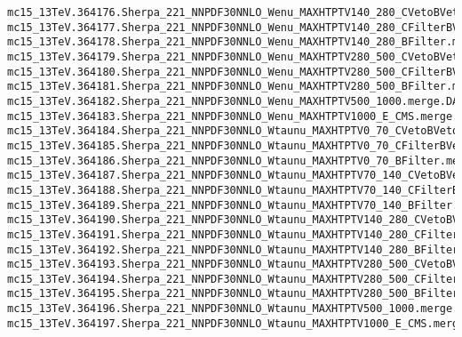 \begin{scriptsize}
\begin{verbatim}
mc15_13TeV.364176.Sherpa_221_NNPDF30NNLO_Wenu_MAXHTPTV140_280_CVetoBVeto.merge.DAOD_HIGG5D2.e5340_s2726_r7772_r7676_p2949
mc15_13TeV.364177.Sherpa_221_NNPDF30NNLO_Wenu_MAXHTPTV140_280_CFilterBVeto.merge.DAOD_HIGG5D2.e5340_s2726_r7772_r7676_p2949
mc15_13TeV.364178.Sherpa_221_NNPDF30NNLO_Wenu_MAXHTPTV140_280_BFilter.merge.DAOD_HIGG5D2.e5340_s2726_r7772_r7676_p2949
mc15_13TeV.364179.Sherpa_221_NNPDF30NNLO_Wenu_MAXHTPTV280_500_CVetoBVeto.merge.DAOD_HIGG5D2.e5340_s2726_r7772_r7676_p2949
mc15_13TeV.364180.Sherpa_221_NNPDF30NNLO_Wenu_MAXHTPTV280_500_CFilterBVeto.merge.DAOD_HIGG5D2.e5340_s2726_r7772_r7676_p2949
mc15_13TeV.364181.Sherpa_221_NNPDF30NNLO_Wenu_MAXHTPTV280_500_BFilter.merge.DAOD_HIGG5D2.e5340_s2726_r7772_r7676_p2949
mc15_13TeV.364182.Sherpa_221_NNPDF30NNLO_Wenu_MAXHTPTV500_1000.merge.DAOD_HIGG5D2.e5340_s2726_r7772_r7676_p2949
mc15_13TeV.364183.Sherpa_221_NNPDF30NNLO_Wenu_MAXHTPTV1000_E_CMS.merge.DAOD_HIGG5D2.e5340_s2726_r7772_r7676_p2949
mc15_13TeV.364184.Sherpa_221_NNPDF30NNLO_Wtaunu_MAXHTPTV0_70_CVetoBVeto.merge.DAOD_HIGG5D2.e5340_s2726_r7772_r7676_p2949
mc15_13TeV.364185.Sherpa_221_NNPDF30NNLO_Wtaunu_MAXHTPTV0_70_CFilterBVeto.merge.DAOD_HIGG5D2.e5340_s2726_r7772_r7676_p2949
mc15_13TeV.364186.Sherpa_221_NNPDF30NNLO_Wtaunu_MAXHTPTV0_70_BFilter.merge.DAOD_HIGG5D2.e5340_s2726_r7772_r7676_p2949
mc15_13TeV.364187.Sherpa_221_NNPDF30NNLO_Wtaunu_MAXHTPTV70_140_CVetoBVeto.merge.DAOD_HIGG5D2.e5340_s2726_r7772_r7676_p2949
mc15_13TeV.364188.Sherpa_221_NNPDF30NNLO_Wtaunu_MAXHTPTV70_140_CFilterBVeto.merge.DAOD_HIGG5D2.e5340_s2726_r7772_r7676_p2949
mc15_13TeV.364189.Sherpa_221_NNPDF30NNLO_Wtaunu_MAXHTPTV70_140_BFilter.merge.DAOD_HIGG5D2.e5340_s2726_r7772_r7676_p2949
mc15_13TeV.364190.Sherpa_221_NNPDF30NNLO_Wtaunu_MAXHTPTV140_280_CVetoBVeto.merge.DAOD_HIGG5D2.e5340_s2726_r7772_r7676_p2949
mc15_13TeV.364191.Sherpa_221_NNPDF30NNLO_Wtaunu_MAXHTPTV140_280_CFilterBVeto.merge.DAOD_HIGG5D2.e5340_s2726_r7772_r7676_p2949
mc15_13TeV.364192.Sherpa_221_NNPDF30NNLO_Wtaunu_MAXHTPTV140_280_BFilter.merge.DAOD_HIGG5D2.e5340_s2726_r7772_r7676_p2949
mc15_13TeV.364193.Sherpa_221_NNPDF30NNLO_Wtaunu_MAXHTPTV280_500_CVetoBVeto.merge.DAOD_HIGG5D2.e5340_s2726_r7772_r7676_p2949
mc15_13TeV.364194.Sherpa_221_NNPDF30NNLO_Wtaunu_MAXHTPTV280_500_CFilterBVeto.merge.DAOD_HIGG5D2.e5340_s2726_r7772_r7676_p2949
mc15_13TeV.364195.Sherpa_221_NNPDF30NNLO_Wtaunu_MAXHTPTV280_500_BFilter.merge.DAOD_HIGG5D2.e5340_s2726_r7772_r7676_p2949
mc15_13TeV.364196.Sherpa_221_NNPDF30NNLO_Wtaunu_MAXHTPTV500_1000.merge.DAOD_HIGG5D2.e5340_s2726_r7772_r7676_p2949
mc15_13TeV.364197.Sherpa_221_NNPDF30NNLO_Wtaunu_MAXHTPTV1000_E_CMS.merge.DAOD_HIGG5D2.e5340_s2726_r7772_r7676_p2949
\end{verbatim}


\end{scriptsize}
